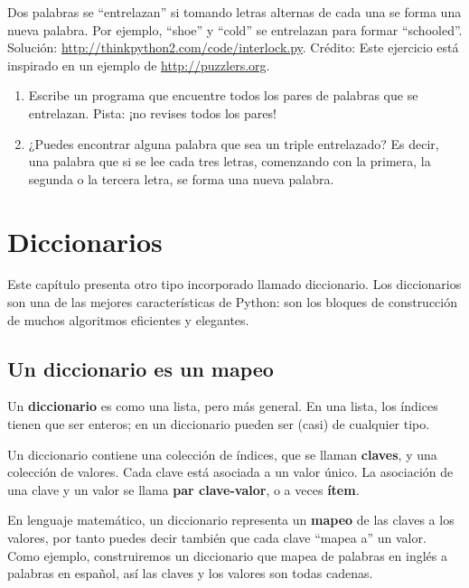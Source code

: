 \documentclass[10pt]{book}
\begin{document}
\begin{exercise}

Dos palabras se ``entrelazan'' si tomando letras alternas de cada una se forma
una nueva palabra.  Por ejemplo, ``shoe'' y ``cold''
se entrelazan para formar ``schooled''.
Solución: \url{http://thinkpython2.com/code/interlock.py}.
Crédito: Este ejercicio está inspirado en un ejemplo de \url{http://puzzlers.org}.

\begin{enumerate}

\item Escribe un programa que encuentre todos los pares de palabras que se entrelazan.
  Pista: ¡no revises todos los pares!

\item ¿Puedes encontrar alguna palabra que sea un triple entrelazado? Es decir,
  una palabra que si se lee cada tres letras, comenzando con la primera, la segunda o
  la tercera letra, se forma una nueva palabra.

\end{enumerate}
\end{exercise}


\chapter{Diccionarios}

Este capítulo presenta otro tipo incorporado llamado diccionario.
Los diccionarios son una de las mejores características de Python: son los
bloques de construcción de muchos algoritmos eficientes y elegantes.


\section{Un diccionario es un mapeo}

Un {\bf diccionario} es como una lista, pero más general.  En una lista,
los índices tienen que ser enteros; en un diccionario pueden ser
(casi) de cualquier tipo.

Un diccionario contiene una colección de índices, que se llaman {\bf
  claves}, y una colección de valores.  Cada clave está asociada a un
valor único.  La asociación de una clave y un valor se llama {\bf
  par clave-valor}, o a veces {\bf ítem}.  

En lenguaje matemático, un diccionario representa un {\bf mapeo}
de las claves a los valores, por tanto puedes decir también que cada clave
``mapea a'' un valor.
Como ejemplo, construiremos un diccionario que mapea de palabras en inglés
a palabras en español, así las claves y los valores son todas cadenas.
\end{document}
